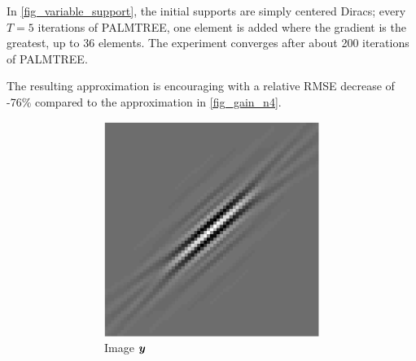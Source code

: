 In \cref{fig_variable_support}, the initial supports are simply centered Diracs; every $T=5$ iterations of \ac{PALMTREE}, one element is added where the gradient is the greatest, up to 36 elements. The experiment converges after about 200 iterations of \ac{PALMTREE}.

The resulting approximation is encouraging with a relative RMSE decrease of -76\% compared to the approximation in \cref{fig_gain_n4}.

\begin{figure}[!ht]\centering
\begin{subfigure}[b]{0.3\textwidth}\centering
	\begin{subfigure}[b]{1\textwidth}\centering
	\includegraphics[width=\textwidth]{figures/variable_support/xp_128x128_sc2_angl1_K3_S3_node4_variable_target.pdf}
	\caption{Image $\bm{y}$}
	\end{subfigure}
	\begin{subfigure}[b]{1\textwidth}\centering

\end{subfigure}
\end{subfigure}
\end{figure}
